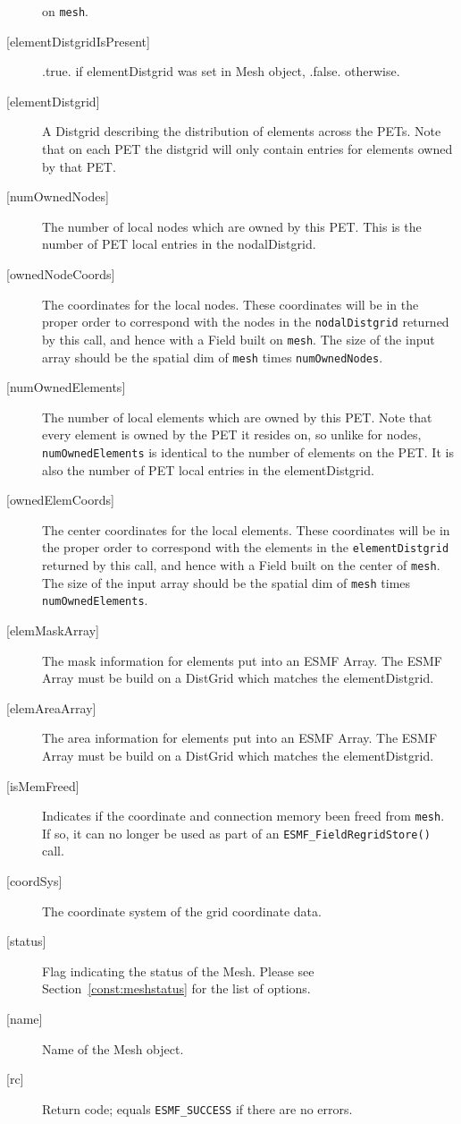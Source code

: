 \begin{description}
   on {\tt mesh}.
   \item [{[elementDistgridIsPresent]}]
   .true. if elementDistgrid was set in Mesh object, .false. otherwise.
   \item [{[elementDistgrid]}]
   A Distgrid describing the distribution of elements across the PETs. Note that
   on each PET the distgrid will only contain entries for elements owned by that PET.
   \item [{[numOwnedNodes]}]
   The number of local nodes which are owned by this PET. This is the number of PET local entries in
   the nodalDistgrid.
   \item [{[ownedNodeCoords]}]
   The coordinates for the local nodes. These coordinates will be in the proper order to correspond
   with the nodes in the {\tt nodalDistgrid} returned by this call, and hence with a Field built on
   {\tt mesh}. The size of the input array should be the spatial dim of {\tt mesh} times
   {\tt numOwnedNodes}.
   \item [{[numOwnedElements]}]
   The number of local elements which are owned by this PET. Note that every element is owned by
   the PET it resides on, so unlike for nodes, {\tt numOwnedElements} is identical to the number of elements on
   the PET. It is also the number of PET local entries in the elementDistgrid.
   \item [{[ownedElemCoords]}]
   The center coordinates for the local elements. These coordinates will be in the proper order to correspond
   with the elements in the {\tt elementDistgrid} returned by this call, and hence with a Field built on the
   center of {\tt mesh}. The size of the input array should be the spatial dim of {\tt mesh} times
   {\tt numOwnedElements}.
   \item [{[elemMaskArray]}]
   The mask information for elements put into an ESMF Array. The ESMF Array must be build on a DistGrid which
   matches the elementDistgrid.
   \item [{[elemAreaArray]}]
   The area information for elements put into an ESMF Array. The ESMF Array must be build on a DistGrid which
   matches the elementDistgrid.
   \item [{[isMemFreed]}]
   Indicates if the coordinate and connection memory been freed from {\tt mesh}. If so, it
   can no longer be used as part of an {\tt ESMF\_FieldRegridStore()} call.
   \item[{[coordSys]}]
    The coordinate system of the grid coordinate data.
   \item[{[status]}]
      Flag indicating the status of the Mesh. Please
      see Section~\ref{const:meshstatus} for the list of options.
   \item [{[name]}]
      Name of the Mesh object.
   \item [{[rc]}]
           Return code; equals {\tt ESMF\_SUCCESS} if there are no errors.
   \end{description}
   
